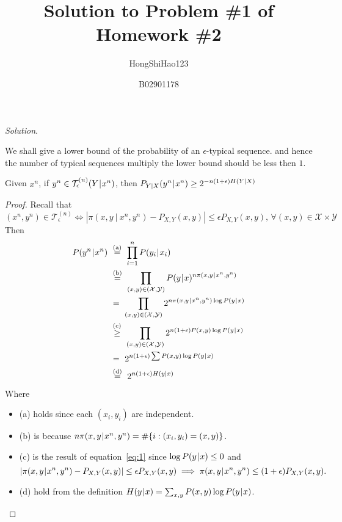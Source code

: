 \documentclass[12pt]{article}
\title{Solution to Problem \#1 of Homework \#2}
\author{HongShiHao123}
\date{B02901178}
\begin{document}
\maketitle

\thispagestyle{fancyplain}

\flushleft 
\newcommand{\cond}{\mskip1mu|\mskip1mu}

{\it Solution}.\par
\smallskip
We shall give a lower bound of the probability of an $\epsilon$-typical sequence.
and hence the number of typical sequences multiply the lower bound should be less then $1$.

\begin{lemma} \label{lm:1}
  Given $x^n$, if $y^n \in \mathcal{T}^{(n)}_\epsilon(Y \cond x^n)$, then $P_{Y|X}(y^n \cond x^n) \geq 2^{-n (1 + \epsilon) H(Y | X)}$
\end{lemma}
\begin{proof}
  Recall that 
  \begin{equation} \label{eq:1}
    (x^n, y^n) \in \mathcal{T}^{(n)}_\epsilon \iff \left\lvert \pi(x, y \:|\: x^n, y^n) - P_{X, Y}(x, y) \right\rvert
    \leq \epsilon P_{X, Y}(x, y), \, \forall (x, y) \in \mathcal{X} \times \mathcal{Y} 
  \end{equation}
  Then
  \begin{align*}
    P(y^n \cond x^n) &\ \stackrel{(\text{a})}{=}\ \prod_{i = 1}^{n} P(y_i \cond x_i)   \\
    &\ \stackrel{(\text{b})}{=} \ \prod_{(x, y) \in (\mathcal{X}, \mathcal{Y})} P(y \cond x)^{n \pi(x, y \cond x^n, y^n)} \\
    &\ = \ \prod_{(x, y) \in (\mathcal{X}, \mathcal{Y})} 2^{n \pi(x, y \cond x^n, y^n) \log P(y \cond x)} \\
    &\ \stackrel{(\text{c})}{\geq} 
      \ \prod_{(x, y) \in (\mathcal{X}, \mathcal{Y})} 2^{n (1 + \epsilon) P(x, y) \log P(y \cond x)} \\
    &\ =\  2^{n (1 + \epsilon) \sum  P(x, y) \log P(y \cond x)} \\
    &\ \stackrel{(\text{d})}{=}\  2^{n(1 + \epsilon) H(y | x)}
  \end{align*}
  Where 
  \begin{itemize}
    \item[] (a) holds since each $(x_i, y_i)$ are independent.\\
    \item[] (b) is because $n \pi(x, y \cond x^n, y^n) = \#\{i: (x_i, y_i) = (x, y)\}$.
    \item[] (c) is the result of equation~\eqref{eq:1} since $\log P(y \cond x) \leq 0$ and
      \[
        \left\lvert \pi(x, y \cond x^n, y^n) - P_{X, Y}(x, y) \right\rvert
        \leq \epsilon P_{X, Y}(x, y) \implies \pi(x, y \cond x^n, y^n) \leq (1 + \epsilon) P_{X, Y}(x, y).
      \]
    \item[] (d) hold from the definition $H(y \cond x) = \sum_{x, y} P(x, y) \log P(y \cond x)$.
  \end{itemize}
\end{proof}
\end{document}
